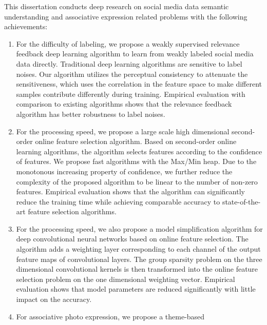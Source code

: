\documentclass[doctor]{ustcthesis}
\begin{document}
\begin{enabstract}
    \vspace{0.5em}
    This dissertation conducts deep research on social media data semantic
    understanding and associative expression related problems with the following achievements:
    \vspace{-0.5em}
    \begin{enumerate}\setlength{\itemsep}{-0.5em}
        \item For the difficulty of labeling, we propose a weakly supervised
            relevance feedback deep learning algorithm to learn from
            weakly labeled social media data directly.  Traditional deep
            learning algorithms are sensitive to label noises.
            Our algorithm utilizes the perceptual consistency to
            attenuate the sensitiveness, which uses the correlation in the
            feature space to make different samples contribute differently
            during training.  Empirical evaluation with comparison to existing
            algorithms shows that the relevance feedback algorithm has better
            robustness to label noises.
        \item For the processing speed, we propose a large scale high
            dimensional second-order online feature selection algorithm. Based
            on second-order online learning algorithms, the algorithm selects features
            according to the confidence of features. We propose fast algorithms
            with the Max/Min heap. Due to the monotonous increasing property of
            confidence, we further reduce the complexity of the proposed
            algorithm to be linear to the number of non-zero features.
            Empirical evaluation shows that the algorithm can significantly reduce the training
            time while achieving comparable accuracy to state-of-the-art feature selection
            algorithms.
        \item For the processing speed, we also propose a model simplification algorithm for
            deep convolutional neural networks based on online feature selection.
            The algorithm adds a weighting layer corresponding to each channel of the output
            feature maps of convolutional layers.  The group sparsity problem on the
            three dimensional convolutional kernels is then transformed into the online feature
            selection problem on the one dimensional weighting vector.  Empirical evaluation shows that
            model parameters are reduced significantly with little impact on the accuracy.
        \item For associative photo expression, we propose a theme-based

\end{enumerate}
\end{enabstract}
\end{document}
